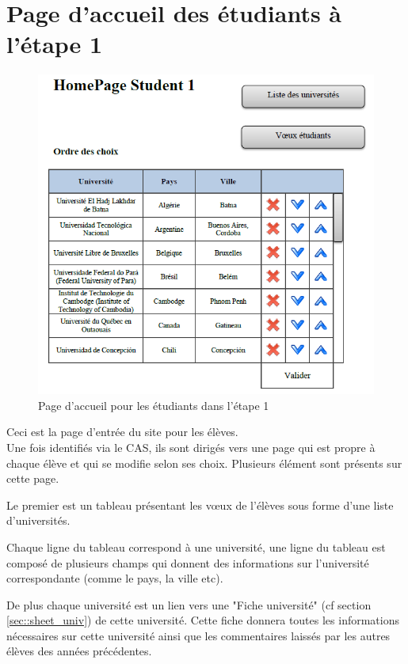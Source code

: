 \section{Page d'accueil des étudiants à l'étape 1}

\begin{figure}[H]
	\includegraphics[scale=0.9]{Etudiant/HPS1.PNG}
	\caption{Page d'accueil pour les étudiants dans l'étape 1}
\end{figure}

Ceci est la page d'entrée du site pour les élèves.\\
Une fois identifiés via le CAS, ils sont dirigés vers une page qui est propre à chaque élève et qui se modifie selon ses choix.
Plusieurs élément sont présents sur cette page.

\bigbreak

Le premier est un tableau présentant les vœux de l'élèves sous forme d'une liste d'universités.

Chaque ligne du tableau correspond à une université, une ligne du tableau est composé de plusieurs champs qui donnent des informations sur l'université correspondante (comme le pays, la ville etc).

De plus chaque université est un lien vers une "Fiche université" (cf section \ref{sec::sheet_univ}) de cette université. Cette fiche donnera toutes les informations nécessaires sur cette université ainsi que les commentaires laissés par les autres élèves des années précédentes.

